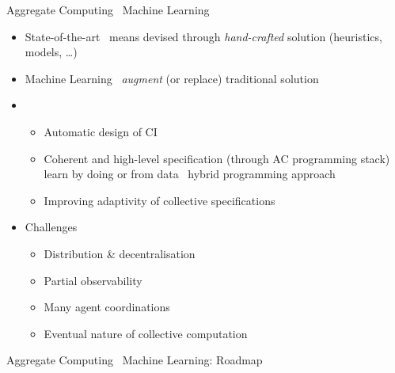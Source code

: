 \documentclass[8pt, aspectratio=169, handout]{beamer}
\begin{document}
\begin{frame}{Aggregate Computing \faPlus \,  Machine Learning}
  \begin{card}
    \begin{itemize}
      \item State-of-the-art \faArrowRight \, means devised through \emph{hand-crafted} solution (heuristics, models, \dots)
      \item Machine Learning \faArrowRight \, \emph{augment} (or replace) traditional solution 
      \item[\success{\faThumbsUp}] 
      \begin{itemize}
        \item Automatic design of CI
        \item Coherent and high-level specification (through AC programming stack) \faPlus \, learn by doing or from data \faArrowRight \, hybrid programming approach
        \item Improving adaptivity of collective specifications
      \end{itemize}
      \item[\failure{\faThumbsDown}] Challenges
      \begin{itemize}
        \item Distribution \& decentralisation 
        \item Partial observability
        \item Many agent coordinations
        \item Eventual nature of collective computation
      \end{itemize}
    \end{itemize}
  \end{card}
\end{frame}
\begin{frame}{Aggregate Computing \faPlus \,  Machine Learning: Roadmap}
  \centering
\end{frame}
\end{document}
